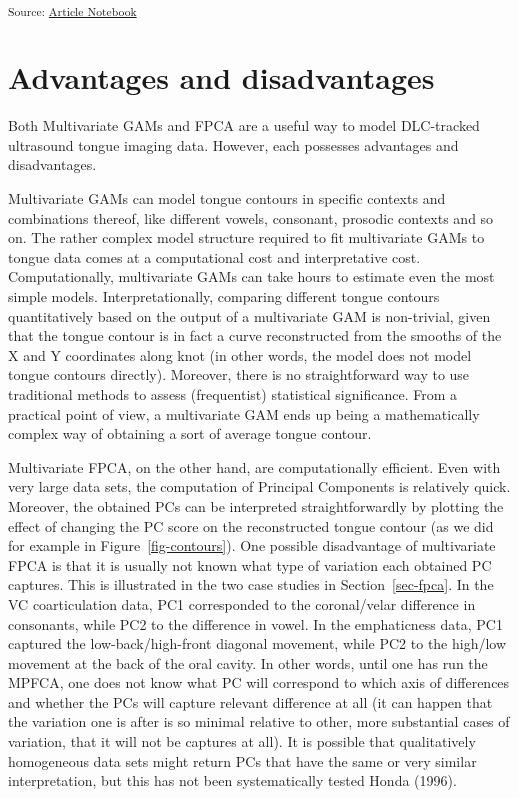 \documentclass[
]{interact}
\begin{document}
\textsubscript{Source:
\href{https://stefanocoretta.github.io/mv_uti/index.qmd.html}{Article
Notebook}}

\section{Advantages and disadvantages}\label{sec-procons}

Both Multivariate GAMs and FPCA are a useful way to model DLC-tracked
ultrasound tongue imaging data. However, each possesses advantages and
disadvantages.

Multivariate GAMs can model tongue contours in specific contexts and
combinations thereof, like different vowels, consonant, prosodic
contexts and so on. The rather complex model structure required to fit
multivariate GAMs to tongue data comes at a computational cost and
interpretative cost. Computationally, multivariate GAMs can take hours
to estimate even the most simple models. Interpretationally, comparing
different tongue contours quantitatively based on the output of a
multivariate GAM is non-trivial, given that the tongue contour is in
fact a curve reconstructed from the smooths of the X and Y coordinates
along knot (in other words, the model does not model tongue contours
directly). Moreover, there is no straightforward way to use traditional
methods to assess (frequentist) statistical significance. From a
practical point of view, a multivariate GAM ends up being a
mathematically complex way of obtaining a sort of average tongue
contour.

Multivariate FPCA, on the other hand, are computationally efficient.
Even with very large data sets, the computation of Principal Components
is relatively quick. Moreover, the obtained PCs can be interpreted
straightforwardly by plotting the effect of changing the PC score on the
reconstructed tongue contour (as we did for example in
Figure~\ref{fig-contours}). One possible disadvantage of multivariate
FPCA is that it is usually not known what type of variation each
obtained PC captures. This is illustrated in the two case studies in
Section~\ref{sec-fpca}. In the VC coarticulation data, PC1 corresponded
to the coronal/velar difference in consonants, while PC2 to the
difference in vowel. In the emphaticness data, PC1 captured the
low-back/high-front diagonal movement, while PC2 to the high/low
movement at the back of the oral cavity. In other words, until one has
run the MPFCA, one does not know what PC will correspond to which axis
of differences and whether the PCs will capture relevant difference at
all (it can happen that the variation one is after is so minimal
relative to other, more substantial cases of variation, that it will not
be captures at all). It is possible that qualitatively homogeneous data
sets might return PCs that have the same or very similar interpretation,
but this has not been systematically tested Honda (1996).
\end{document}
